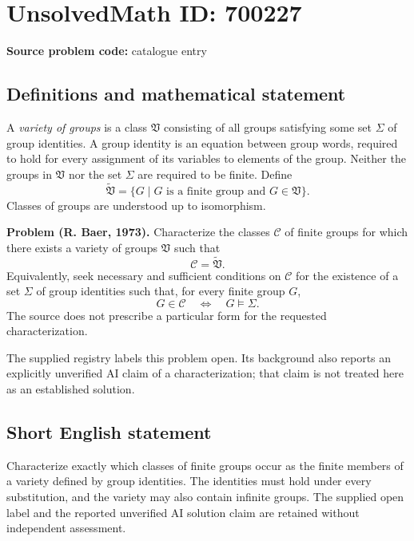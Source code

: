 \documentclass[11pt]{article}
\begin{document}
\section*{UnsolvedMath ID: 700227}
\textbf{Source problem code:} catalogue entry
\subsection{Definitions and mathematical statement}
A \emph{variety of groups} is a class \(\mathfrak V\) consisting of all groups satisfying some set \(\Sigma\) of group identities. A group identity is an equation between group words, required to hold for every assignment of its variables to elements of the group. Neither the groups in \(\mathfrak V\) nor the set \(\Sigma\) are required to be finite. Define
\[
\widetilde{\mathfrak V}=\{G\mid G\text{ is a finite group and }G\in\mathfrak V\}.
\]
Classes of groups are understood up to isomorphism.

\textbf{Problem (R. Baer, 1973).} Characterize the classes \(\mathcal C\) of finite groups for which there exists a variety of groups \(\mathfrak V\) such that
\[
\mathcal C=\widetilde{\mathfrak V}.
\]
Equivalently, seek necessary and sufficient conditions on \(\mathcal C\) for the existence of a set \(\Sigma\) of group identities such that, for every finite group \(G\),
\[
G\in\mathcal C\quad\Longleftrightarrow\quad G\models\Sigma.
\]
The source does not prescribe a particular form for the requested characterization.

The supplied registry labels this problem open. Its background also reports an explicitly unverified AI claim of a characterization; that claim is not treated here as an established solution.
\subsection{Short English statement}
Characterize exactly which classes of finite groups occur as the finite members of a variety defined by group identities. The identities must hold under every substitution, and the variety may also contain infinite groups. The supplied open label and the reported unverified AI solution claim are retained without independent assessment.
\end{document}
